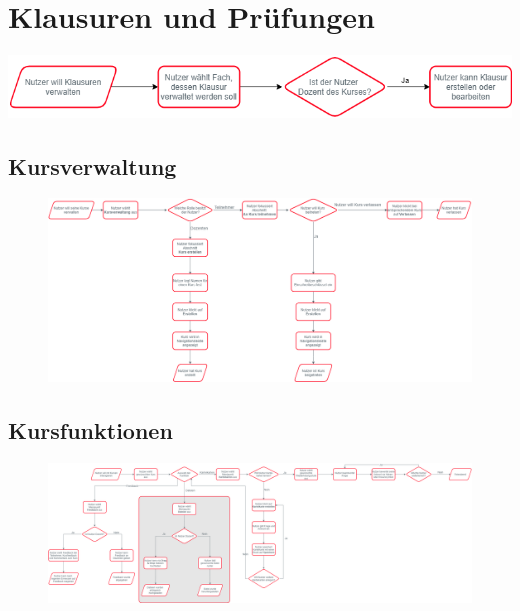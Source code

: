 \section{Klausuren und Prüfungen}
	\includegraphics[width=\linewidth, keepaspectratio]{img/Prozesse/exams}

	\begin{landscape}
		\section{Kursverwaltung}
			\begin{figure}[!h]
				\includegraphics[width=\linewidth, keepaspectratio]{img/Prozesse/coursemanagement}
			\end{figure}
	\end{landscape}

	\begin{landscape}
		\section{Kursfunktionen}
			\begin{figure}[!h]
				\includegraphics[width=\linewidth, keepaspectratio]{img/Prozesse/coursefunction}
			\end{figure}
	\end{landscape}

